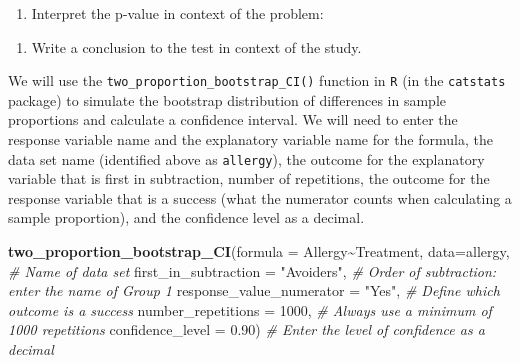 \documentclass[
]{report}
\newenvironment{Shaded}{\begin{snugshade}}{\end{snugshade}}
\newcommand{\AttributeTok}[1]{\textcolor[rgb]{0.13,0.29,0.53}{#1}}
\newcommand{\CommentTok}[1]{\textcolor[rgb]{0.56,0.35,0.01}{\textit{#1}}}
\newcommand{\DecValTok}[1]{\textcolor[rgb]{0.00,0.00,0.81}{#1}}
\newcommand{\FloatTok}[1]{\textcolor[rgb]{0.00,0.00,0.81}{#1}}
\newcommand{\FunctionTok}[1]{\textcolor[rgb]{0.13,0.29,0.53}{\textbf{#1}}}
\newcommand{\NormalTok}[1]{#1}
\newcommand{\SpecialCharTok}[1]{\textcolor[rgb]{0.81,0.36,0.00}{\textbf{#1}}}
\newcommand{\StringTok}[1]{\textcolor[rgb]{0.31,0.60,0.02}{#1}}
\providecommand{\tightlist}{%
  \setlength{\itemsep}{0pt}\setlength{\parskip}{0pt}}
\begin{document}
\begin{enumerate}
\def\labelenumi{\arabic{enumi}.}
\setcounter{enumi}{10}
\tightlist
\item
  Interpret the p-value in context of the problem:
\end{enumerate}

\vspace{1in}

\begin{enumerate}
\def\labelenumi{\arabic{enumi}.}
\setcounter{enumi}{11}
\tightlist
\item
  Write a conclusion to the test in context of the study.
\end{enumerate}

\vspace{1in}

\newpage

We will use the \texttt{two\_proportion\_bootstrap\_CI()} function in \texttt{R} (in the \texttt{catstats} package) to simulate the bootstrap distribution of differences in sample proportions and calculate a confidence interval. We will need to enter the response variable name and the explanatory variable name for the formula, the data set name (identified above as \texttt{allergy}), the outcome for the explanatory variable that is first in subtraction, number of repetitions, the outcome for the response variable that is a success (what the numerator counts when calculating a sample proportion), and the confidence level as a decimal.

\begin{Shaded}
\begin{Highlighting}[]
\FunctionTok{two\_proportion\_bootstrap\_CI}\NormalTok{(}\AttributeTok{formula =}\NormalTok{ Allergy}\SpecialCharTok{\textasciitilde{}}\NormalTok{Treatment, }
        \AttributeTok{data=}\NormalTok{allergy, }\CommentTok{\# Name of data set}
        \AttributeTok{first\_in\_subtraction =} \StringTok{"Avoiders"}\NormalTok{, }\CommentTok{\# Order of subtraction: enter the name of Group 1}
        \AttributeTok{response\_value\_numerator =} \StringTok{"Yes"}\NormalTok{, }\CommentTok{\# Define which outcome is a success }
        \AttributeTok{number\_repetitions =} \DecValTok{1000}\NormalTok{, }\CommentTok{\# Always use a minimum of 1000 repetitions}
        \AttributeTok{confidence\_level =} \FloatTok{0.90}\NormalTok{) }\CommentTok{\# Enter the level of confidence as a decimal}
\end{Highlighting}
\end{Shaded}
\end{document}
